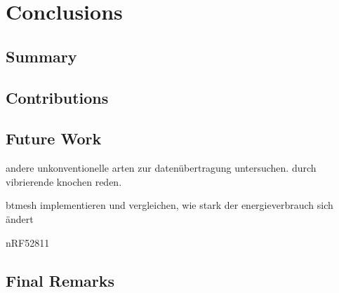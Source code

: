 \chapter{Conclusions}
\label{ch:closure}

\section{Summary}

\section{Contributions}

\section{Future Work}
andere unkonventionelle arten zur datenübertragung untersuchen. durch vibrierende knochen reden.

btmesh implementieren und vergleichen, wie stark der energieverbrauch sich ändert

nRF52811
\section{Final Remarks}
